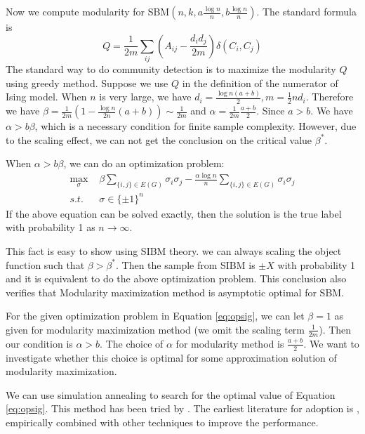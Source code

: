 \documentclass{article}
\begin{document}
	Now we compute modularity for SBM$(n,k, a\frac{\log n}{n}, b\frac{\log n}{n})$.
	The standard formula is
	\begin{equation}
	Q = \frac{1}{2m} \sum_{ij} (A_{ij} - \frac{d_i d_j}{2m}) \delta(C_i, C_j)
	\end{equation}
	The standard way to do community detection is to maximize the modularity $Q$ using greedy method.
	Suppose we use $Q$ in the definition of the numerator of Ising model. When $n$ is very large,
	we have $d_i = \frac{\log n(a+b)}{2}, m = \frac{1}{2}n d_i$. Therefore we have $\beta = \frac{1}{2m}(1-\frac{\log n}{2n}(a+b))
	\sim \frac{1}{2m}$
	and $\alpha = \frac{1}{2m}\frac{a+b}{2}$. Since $a>b$. We have $\alpha > b \beta$, which is a necessary condition for finite sample complexity.
	However, due to the scaling effect, we can not get the conclusion on the critical value $\beta^*$.
	
	When $\alpha > b \beta$, we can do an optimization problem:
	\begin{align}\label{eq:opsig}
	\max_{\sigma} \,\,& \beta \sum_{\{i,j\} \in E(G)} \sigma_i \sigma_j - \frac{\alpha \log n}{n} \sum_{\{i,j\} \in E(G)} \sigma_i \sigma_j\\
	s.t. \,\, & \sigma \in \{\pm 1\}^n
	\end{align}
	If the above equation can be solved exactly, then the solution is the true label with probability 1 as $n\to \infty$.
	
	This fact is easy to show using SIBM theory. we can always scaling the object function such that $\beta > \beta^*$.
	Then the sample from SIBM is $\pm X$ with probability 1 and it is equivalent to do the above optimization problem.
	This conclusion also verifies that Modularity maximization method is asymptotic optimal for SBM.
	
	For the given optimization problem in Equation \eqref{eq:opsig}, we can let $\beta = 1$ as given for modularity maximization method (we omit the scaling term $\frac{1}{2m}$).
	Then our condition is $\alpha > b$. The choice of $\alpha$ for modularity method is $\frac{a+b}{2}$. We want to
	investigate whether this choice is optimal for some approximation solution of modularity maximization.
	
	We can use simulation annealing to search for the optimal value of Equation \eqref{eq:opsig}. This method has been tried
	by \cite{he2016fast}. The earliest literature for adoption is \cite{liu2010detecting}, empirically combined with other techniques to improve
	the performance.
\end{document}
